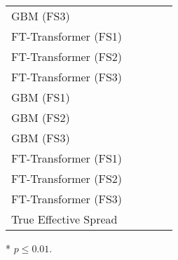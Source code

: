 \begin{threeparttable}
\begin{tabular}{lSSSS}
        \gls{GBM} (FS3)       &                                                         & \tnote{*}                                                &               & \tnote{*}     \\
        FT-Transformer (FS1)  &                                                         & \tnote{*}                                                &               & \tnote{*}     \\
        FT-Transformer (FS2)  &                                                         & \tnote{*}                                                &               & \tnote{*}     \\
        FT-Transformer (FS3)  &                                                         & \tnote{*}                                                &               & \tnote{*}     \\ \midrule
        \gls{GBM} (FS1)       &                                                         & \tnote{*}                                                &               & \tnote{*}     \\
        \gls{GBM} (FS2)       &                                                         & \tnote{*}                                                &               & \tnote{*}     \\
        \gls{GBM} (FS3)       &                                                         & \tnote{*}                                                &               & \tnote{*}     \\
        FT-Transformer (FS1)  &                                                         & \tnote{*}                                                &               & \tnote{*}     \\
        FT-Transformer (FS2)  &                                                         & \tnote{*}                                                &               & \tnote{*}     \\
        FT-Transformer (FS3)  &                                                         & \tnote{*}                                                &               &     \\ \midrule
        True Effective Spread &                                                         &                                               &               & \tnote{*}     \\ \bottomrule
    \end{tabular}
    \begin{tablenotes}\footnotesize
        \item[*] $p \leq 0.01$.
    \end{tablenotes}
\end{threeparttable}